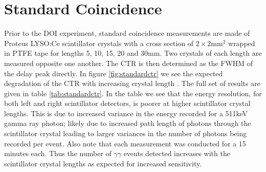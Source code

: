 \section{Standard Coincidence}
\label{sec:standardctr}
Prior to the DOI experiment, standard coincidence measurements are made of Proteus LYSO:Ce scintillator crystals with a cross section of $2\times2$mm$^2$ wrapped in PTFE tape for lengths 5, 10, 15, 20 and 30mm. Two crystals of each length are measured opposite one another. The CTR is then determined as the FWHM of the delay peak directly. In figure \ref{fig:standardctr} we see the expected degradation of the CTR with increasing crystal length \cite{r_Paganoni_Pauwels_et_al__2011}\cite{Wiener_Kaul_Surti_Karp_2010}\cite{Choong_2009}\cite{Gola_Piemonte_Tarolli_2013}\cite{o_Pro_Serra_Tarolli_Zorzi_2011}. The full set of results are given in table \ref{tab:standardctr}. In the table we see that the energy resolution, for both left and right scintillator detectors, is poorer at higher scintillator crystal lengths. This is due to increased variance in the energy recorded for a 511keV gamma ray photon; likely due to increased path length of photons through the scintillator crystal leading to larger variances in the number of photons being recorded per event. Also note that each measurement was conducted for a 15 minutes each. Thus the number of $\gamma\gamma$ events detected increases with the scintillator crystal lengths as expected for increased sensitivity.